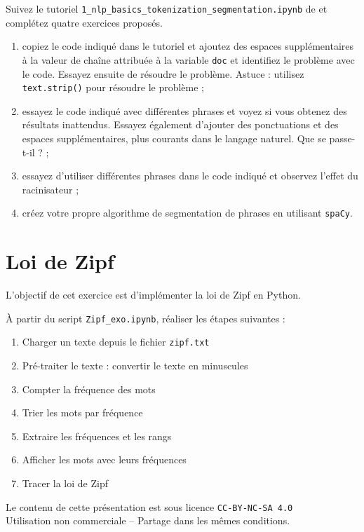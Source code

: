 \documentclass[xcolor={table,usenames,dvipsnames}]{article}
\begin{document}
	Suivez le tutoriel \texttt{1\_nlp\_basics\_tokenization\_segmentation.ipynb} de \textcite{saravia} et complétez quatre exercices proposés.
	\begin{enumerate}
		\item copiez le code indiqué dans le tutoriel et ajoutez des espaces supplémentaires à la valeur de chaîne attribuée à la variable \texttt{doc} et identifiez le problème avec le code. Essayez ensuite de résoudre le problème. Astuce : utilisez \texttt{text.strip()} pour résoudre le problème ;
		\item essayez le code indiqué avec différentes phrases et voyez si vous obtenez des résultats inattendus. Essayez également d'ajouter des ponctuations et des espaces supplémentaires, plus courants dans le langage naturel. Que se passe-t-il ? ;
		\item essayez d'utiliser différentes phrases dans le code indiqué et observez l'effet du racinisateur ;
		\item créez votre propre algorithme de segmentation de phrases en utilisant \texttt{spaCy}.
	\end{enumerate}
	
	\section{Loi de Zipf}  %
	
	L'objectif de cet exercice est d'implémenter la loi de Zipf en Python.
	
	\bigskip
	
	À partir du script \texttt{Zipf\_exo.ipynb}, réaliser les étapes suivantes :
	\begin{enumerate}
		\item Charger un texte depuis le fichier \texttt{zipf.txt}
		\item Pré-traiter le texte : convertir le texte en minuscules
		\item Compter la fréquence des mots
		\item Trier les mots par fréquence
		\item Extraire les fréquences et les rangs
		\item  Afficher les mots avec leurs fréquences
		\item Tracer la loi de Zipf
	\end{enumerate}
	
\hrulefill

\printbibliography


\centering
{\small Le contenu de cette présentation est sous licence \texttt{CC-BY-NC-SA 4.0}\\Utilisation non commerciale -- Partage dans les mêmes conditions.\\}
\href{https://creativecommons.org/licenses/by-nc-sa/4.0/deed.fr}{\ccbyncsa}

	
\end{document}
